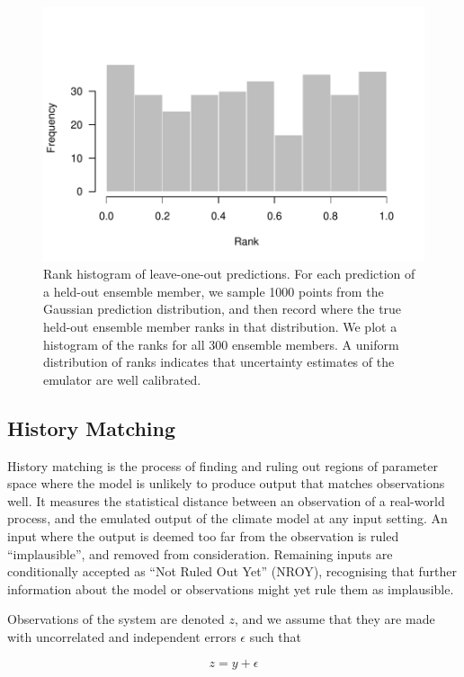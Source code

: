 \documentclass[gmd, manuscript]{copernicus}
\begin{document}
\begin{figure}[t]
\includegraphics[width=12cm]{../graphics/rankhist.pdf}
\caption{Rank histogram of leave-one-out predictions. For each prediction of a held-out ensemble member, we sample 1000 points from the Gaussian prediction distribution, and then record where the true held-out ensemble member ranks in that distribution. We plot a histogram of the ranks for all 300 ensemble members. A uniform distribution of ranks indicates that uncertainty estimates of the emulator are well calibrated.
}
\label{fig:rankhist}
\end{figure}


\subsection{History Matching}\label{ssec:history_matching}

History matching is the process of finding and ruling out regions of parameter space where the model is unlikely to produce output that matches observations well. It measures the statistical distance between an observation of a real-world process, and the emulated output of the climate model at any input setting. An input where the output is deemed too far from the observation is ruled ``implausible'', and removed from consideration. Remaining inputs are conditionally accepted as ``Not Ruled Out Yet'' (NROY), recognising that further information about the model or observations might yet rule them as implausible.

Observations of the system are denoted $z$, and we assume that they are made with uncorrelated and independent errors $\epsilon$  such that

\begin{equation}
z = y+\epsilon
\end{equation}
\end{document}

